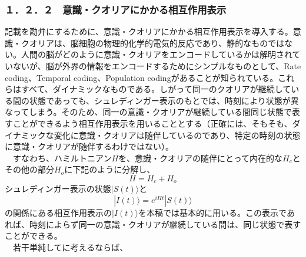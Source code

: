 \subsubsection{１．２．２　意識・クオリアにかかる相互作用表示}
記載を勘弁にするために、意識・クオリアにかかる相互作用表示を導入する。意識・クオリアは、脳細胞の物理的化学的電気的反応であり、静的なものではない。人間の脳がどのように意識・クオリアをエンコードしているかは解明されていないが、脳が外界の情報をエンコードするためにシンプルなものとして、Rate coding、Temporal coding、Population codingがあることが知られている\cite{wikipediac}。これらはすべて、ダイナミックなものである。しがって同一のクオリアが継続している間の状態であっても、シュレディンガー表示のもとでは、時刻により状態が異なってしまう。そのため、同一の意識・クオリアが継続している間同じ状態で表すことができるよう相互作用表示を用いることとする（正確には、そもそも、ダイナミックな変化に意識・クオリアは随伴しているのであり、特定の時刻の状態に意識・クオリアが随伴するわけではない）。\\
　すなわち、ハミルトニアン$H$を、意識・クオリアの随伴にとって内在的な$H_c$とその他の部分$H_o$に下記のように分解し、
　\begin{equation}
  H=H_c + H_o
\end{equation}
シュレディンガー表示の状態$|S(t)\rangle$と
　\begin{equation}
  |I(t)\rangle = e^{iHt}|S(t)\rangle
\end{equation}
の関係にある相互作用表示の$|I(t)\rangle$を本稿では基本的に用いる。この表示であれば、時刻によらず同一の意識・クオリアが継続している間は、同じ状態で表すことができる。\\
　若干単純してに考えるならば、

